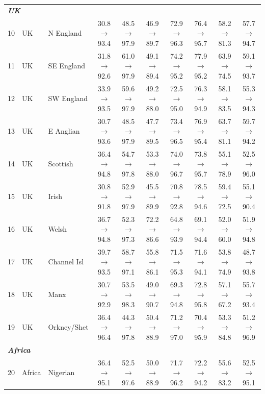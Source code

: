\begin{table}[t]
{\begin{tabular}{rll c c c c c c c}
\midrule
\multicolumn{10}{l}{\textit{\textbf{UK}}} \\
10 & UK & N England & 30.8$\rightarrow$93.4 & 48.5$\rightarrow$97.9 & 46.9$\rightarrow$89.7 & 72.9$\rightarrow$96.3 & 76.4$\rightarrow$95.7 & 58.2$\rightarrow$81.3 & 57.7$\rightarrow$94.7 \\
11 & UK & SE England & 31.8$\rightarrow$92.6 & 61.0$\rightarrow$97.9 & 49.1$\rightarrow$89.4 & 74.2$\rightarrow$95.2 & 77.9$\rightarrow$95.2 & 63.9$\rightarrow$74.5 & 59.1$\rightarrow$93.7 \\
12 & UK & SW England & 33.9$\rightarrow$93.5 & 59.6$\rightarrow$97.9 & 49.2$\rightarrow$88.0 & 72.5$\rightarrow$95.0 & 76.3$\rightarrow$94.9 & 58.1$\rightarrow$83.5 & 55.3$\rightarrow$94.3 \\
13 & UK & E Anglian & 30.7$\rightarrow$93.6 & 48.5$\rightarrow$97.9 & 47.7$\rightarrow$89.5 & 73.4$\rightarrow$96.5 & 76.9$\rightarrow$95.4 & 63.7$\rightarrow$81.1 & 59.7$\rightarrow$94.2 \\
14 & UK & Scottish & 36.4$\rightarrow$94.8 & 54.7$\rightarrow$97.8 & 53.3$\rightarrow$88.0 & 74.0$\rightarrow$96.7 & 73.8$\rightarrow$95.7 & 55.1$\rightarrow$78.9 & 52.5$\rightarrow$96.0 \\
15 & UK & Irish & 30.8$\rightarrow$91.8 & 52.9$\rightarrow$97.9 & 45.5$\rightarrow$89.9 & 70.8$\rightarrow$92.8 & 78.5$\rightarrow$94.6 & 59.4$\rightarrow$72.5 & 55.1$\rightarrow$90.4 \\
16 & UK & Welsh & 36.7$\rightarrow$94.8 & 52.3$\rightarrow$97.3 & 72.2$\rightarrow$86.6 & 64.8$\rightarrow$93.9 & 69.1$\rightarrow$94.4 & 52.0$\rightarrow$60.0 & 51.9$\rightarrow$94.8 \\
17 & UK & Channel Isl & 39.7$\rightarrow$93.5 & 58.7$\rightarrow$97.1 & 55.8$\rightarrow$86.1 & 71.5$\rightarrow$95.3 & 71.6$\rightarrow$94.1 & 53.8$\rightarrow$74.9 & 48.7$\rightarrow$93.8 \\
18 & UK & Manx & 30.7$\rightarrow$92.9 & 53.5$\rightarrow$98.3 & 49.0$\rightarrow$90.7 & 69.3$\rightarrow$94.8 & 72.8$\rightarrow$95.8 & 57.1$\rightarrow$67.2 & 55.7$\rightarrow$93.4 \\
19 & UK & Orkney/Shet & 36.4$\rightarrow$96.4 & 44.3$\rightarrow$97.8 & 50.4$\rightarrow$88.9 & 71.2$\rightarrow$97.0 & 70.4$\rightarrow$95.9 & 53.3$\rightarrow$84.8 & 51.2$\rightarrow$96.9 \\
\midrule
\multicolumn{10}{l}{\textit{\textbf{Africa}}} \\
20 & Africa & Nigerian & 36.4$\rightarrow$95.1 & 52.5$\rightarrow$97.6 & 50.0$\rightarrow$88.9 & 71.7$\rightarrow$96.2 & 72.2$\rightarrow$94.2 & 55.6$\rightarrow$83.2 & 52.5$\rightarrow$95.1 \\

\end{tabular}}
\end{table}
